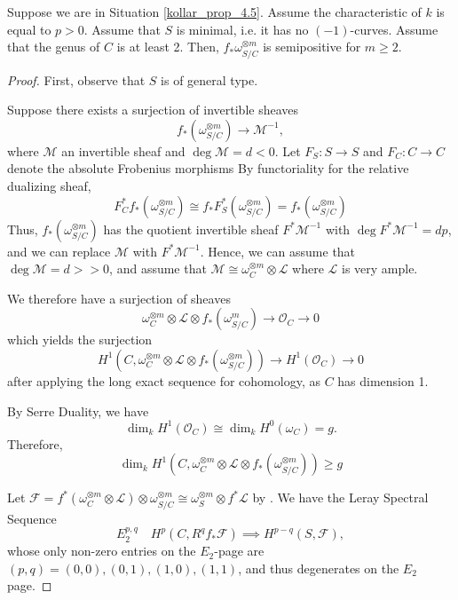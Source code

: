 \begin{lemma}\label{4.5_minimal_base_genus_2_char_p}
Suppose we are in Situation \ref{kollar_prop_4.5}.
Assume the characteristic of $k$ is equal to $p>0$.
Assume that $S$ is minimal, i.e. it has no $(-1)$-curves.
Assume that the genus of $C$ is at least 2.
Then, $f_*\omega_{S/C}^{\otimes m}$ is semipositive for $m \geq 2$.
\end{lemma}

\begin{proof}
First, observe that $S$ is of general type. 

Suppose there exists a surjection of invertible sheaves
$$f_*(\omega^{\otimes m}_{S/C})\to \mathcal{M}^{-1},$$
where $\mathcal{M}$ an invertible sheaf and $\deg \mathcal{M}=d<0$.
Let $F_S:S\to S$ and $F_C:C\to C$ denote the absolute Frobenius morphisms
By functoriality for the relative dualizing sheaf,
$$
F_C^*f_*(\omega^{\otimes m}_{S/C})\cong f_*F_S^*(\omega^{\otimes m}_{S/C})=f_*(\omega^{\otimes m}_{S/C})
$$
Thus, $f_*(\omega^{\otimes m}_{S/C})$ has the quotient invertible sheaf $F^*\mathcal{M}^{-1}$ with $\deg F^*\mathcal{M}^{-1}=dp$, and we can replace $\mathcal{M}$ with $F^{*}\mathcal{M}^{-1}$. Hence, we can assume that $\deg \mathcal{M}=d>>0$, and assume that $\mathcal{M}\cong \omega_{C}^{\otimes m}\otimes \mathcal{L}$ where $\mathcal{L}$ is very ample.

We therefore have a surjection of sheaves
$$\omega_C^{\otimes m}\otimes \mathcal{L} \otimes f_*(\omega^m_{S/C})\to\mathcal{O}_C\to 0$$
which yields the surjection
$$H^1(C, \omega^{\otimes m}_C\otimes \mathcal{L}\otimes f_*(\omega^{\otimes m}_{S/C}))\to H^1(\mathcal{O}_C)\to 0$$
after applying the long exact sequence for cohomology, as $C$ has dimension 1.

By Serre Duality, we have
$$\dim_k H^1(\mathcal{O}_C)\cong \dim_k H^0(\omega_C)=g.$$
Therefore, $$\dim_k H^1(C, \omega^{\otimes m}_C\otimes \mathcal{L}\otimes f_*(\omega^{\otimes m}_{S/C}))\geq g$$

Let $\mathcal{F}=f^*(\omega^{\otimes m}_C\otimes \mathcal{L})\otimes \omega^{\otimes m}_{S/C}\cong \omega_{S}^{\otimes m}\otimes f^{*}\mathcal{L}$ by . We have the Leray Spectral Sequence
$$E_2^{p,q} \quad H^p(C, R^qf_*\mathcal{F})\implies H^{p-q}(S,\mathcal{F}),$$
whose only non-zero entries on the $E_2$-page are $(p,q)=(0,0),(0,1),(1,0),(1,1)$, and thus degenerates on the $E_2$ page.



\end{proof}
